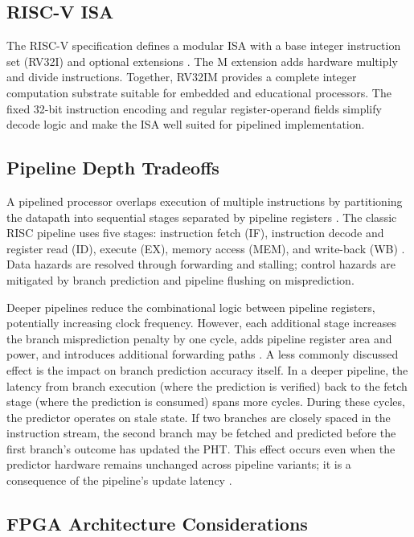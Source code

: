 \documentclass[journal]{IEEEtran}
\begin{document}
\subsection{RISC-V ISA}

The RISC-V specification defines a modular ISA with a base integer instruction set (RV32I) and optional extensions \cite{waterman2019riscv}. The M extension adds hardware multiply and divide instructions. Together, RV32IM provides a complete integer computation substrate suitable for embedded and educational processors. The fixed 32-bit instruction encoding and regular register-operand fields simplify decode logic and make the ISA well suited for pipelined implementation.

\subsection{Pipeline Depth Tradeoffs}

A pipelined processor overlaps execution of multiple instructions by partitioning the datapath into sequential stages separated by pipeline registers \cite{hennessy2017computer, patterson2020computer}. The classic RISC pipeline uses five stages: instruction fetch (IF), instruction decode and register read (ID), execute (EX), memory access (MEM), and write-back (WB) \cite{patterson1985reduced}. Data hazards are resolved through forwarding and stalling; control hazards are mitigated by branch prediction and pipeline flushing on misprediction.

Deeper pipelines reduce the combinational logic between pipeline registers, potentially increasing clock frequency. However, each additional stage increases the branch misprediction penalty by one cycle, adds pipeline register area and power, and introduces additional forwarding paths \cite{hrishikesh2002optimal}. A less commonly discussed effect is the impact on branch prediction accuracy itself. In a deeper pipeline, the latency from branch execution (where the prediction is verified) back to the fetch stage (where the prediction is consumed) spans more cycles. During these cycles, the predictor operates on stale state. If two branches are closely spaced in the instruction stream, the second branch may be fetched and predicted before the first branch's outcome has updated the PHT. This effect occurs even when the predictor hardware remains unchanged across pipeline variants; it is a consequence of the pipeline's update latency \cite{gonzalez1999power}.

\subsection{FPGA Architecture Considerations}
\end{document}
